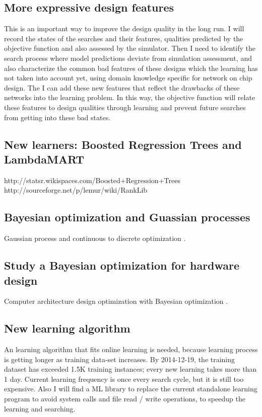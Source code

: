 \documentclass[12pt]{article}
\theoremstyle{definition}
\begin{document}
\subsection{More expressive design features}
This is an important way to improve the design quality in the long run. I will record the states of the searches and their features, qualities predicted by the objective function and also assessed by the simulator. Then I need to identify the search process where model predictions deviate from simulation assessment, and also characterize the common bad features of these designs which the learning has not taken into account yet, using domain knowledge specific for network on chip design. The I can add these new features that reflect the drawbacks of these networks into the learning problem. In this way, the objective function will relate these features to design qualities through learning and prevent future searches from getting into these bad states.
\subsection{New learners: Boosted Regression Trees and LambdaMART}
http://statsr.wikispaces.com/Boosted+Regression+Trees\\
http://sourceforge.net/p/lemur/wiki/RankLib
\subsection{Bayesian optimization and Guassian processes}
Gaussian process and continuous to discrete optimization \cite{brochu2010tutorial}.
\subsection{Study a Bayesian optimization for hardware design}
Computer architecture design optimization with Bayesian optimization \cite{demasiusing}.
\subsection{New learning algorithm}
An learning algorithm that fits online learning is needed, because learning process is getting longer as training data-set increases. By 2014-12-19, the training dataset has exceeded 1.5K training instances; every new learning takes more than 1 day. Current learning frequency is once every search cycle, but it is still too expensive. Also I will find a ML library to replace the current standalone learning program to avoid system calls and file read / write operations, to speedup the learning and searching.
\end{document}
